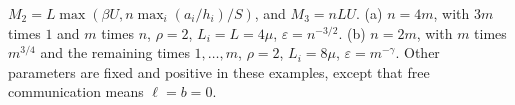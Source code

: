 \begin{table}[tp]
\begin{threeparttable}
\begin{tablenotes}[flushleft]
$M_2=L\max(\beta U,n\max_i(a_i/h_i)/S)$, and $M_3=nLU$.
\textup{(a)} $n=4m$, with $3m$ times $1$ and $m$ times $n$, $\rho=2$, $L_i=L=4\mu$, $\varepsilon=n^{-3/2}$.
\textup{(b)} $n=2m$, with $m$ times $m^{3/4}$ and the remaining times $1,\ldots,m$, $\rho=2$, $L_i=8\mu$, $\varepsilon=m^{-\gamma}$. Other parameters are fixed and positive in these examples, except that free communication means $\ell=b=0$.
\end{tablenotes}
\end{threeparttable}
\end{table}
